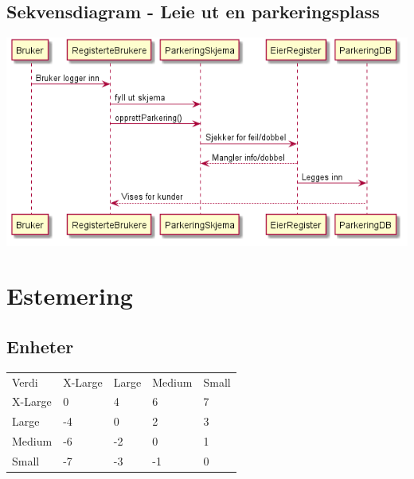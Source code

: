 \documentclass[12pt]{article}
\newcommand{\invis}{\phantom{a}}
\newcommand{\cellr}{\cellcolor{red!25}}
\newcommand{\cello}{\cellcolor{orange!25}}
\newcommand{\celly}{\cellcolor{yellow!25}}
\newcommand{\celll}{\cellcolor{lime!25}}
\newcommand{\cellg}{\cellcolor{green!25}}
\begin{document}
    \subsection{Sekvensdiagram - Leie ut en parkeringsplass}
    \includegraphics[max width=\textwidth]{bilder/diagrammer/sekvensdiagramLeggeUtParkering.png}

\section{Estemering}

    \subsection{Enheter}

    \begin{tabular}{|p{2cm}|
        >{\centering\arraybackslash}p{3cm}|
        >{\centering\arraybackslash}p{3cm}|
        >{\centering\arraybackslash}p{3cm}|
        >{\centering\arraybackslash}p{3cm}|}     
        \hline 
        \invis & \multicolumn{4}{|c|}{Utviklingsstørrelse}\\
        \hline
        Verdi & X-Large & Large & Medium & Small\\
        \hline
        X-Large &   \celly0 &
                    \cellg4 &
                    \cellg6 &
                    \cellg7 \\
        \hline
        Large &     \cellr-4 &
                    \celly0 &
                    \celll2 &
                    \cellg3 \\
        \hline
        Medium &    \cellr-6 &
                    \cello-2 &
                    \celly0 &
                    \celll1 \\
        \hline
        Small &     \cellr-7 &
                    \cellr-3 &
                    \cello-1 &
                    \celly0 \\
        \hline 
    \end{tabular}
\end{document}
